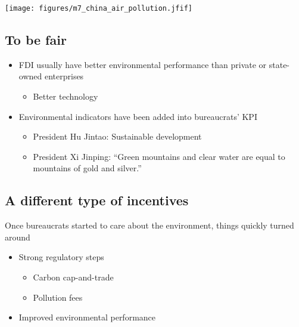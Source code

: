 \documentclass[
]{article}
\providecommand{\tightlist}{%
  \setlength{\itemsep}{0pt}\setlength{\parskip}{0pt}}
\begin{document}
\texttt{[image: figures/m7\_china\_air\_pollution.jfif]}

\hypertarget{to-be-fair}{%
\subsection{To be fair}\label{to-be-fair}}

\begin{itemize}
\tightlist
\item
  FDI usually have better environmental performance than private or
  state-owned enterprises

  \begin{itemize}
  \tightlist
  \item
    Better technology
  \end{itemize}
\item
  Environmental indicators have been added into bureaucrats' KPI

  \begin{itemize}
  \tightlist
  \item
    President Hu Jintao: Sustainable development
  \item
    President Xi Jinping: ``Green mountains and clear water are equal to
    mountains of gold and silver.''
  \end{itemize}
\end{itemize}

\hypertarget{a-different-type-of-incentives}{%
\subsection{A different type of
incentives}\label{a-different-type-of-incentives}}

Once bureaucrats started to care about the environment, things quickly
turned around

\begin{itemize}
\tightlist
\item
  Strong regulatory steps

  \begin{itemize}
  \tightlist
  \item
    Carbon cap-and-trade
  \item
    Pollution fees
  \end{itemize}
\item
  Improved environmental performance
\end{itemize}

\hypertarget{section-6}{%
\subsection{}\label{section-6}}
\end{document}
